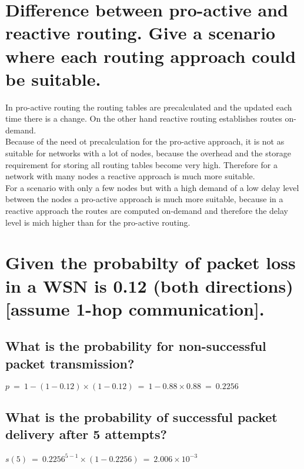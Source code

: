 \documentclass{report}
\begin{document}
	\section{Difference between pro-active and reactive routing. Give a scenario where each routing approach could be suitable.}
	\startsection
		In pro-active routing the routing tables are precalculated and the updated each time there is a change. On the other hand reactive routing establishes routes on-demand. \\
		Because of the need ot precalculation for the pro-active approach, it is not as suitable for networks with a lot of nodes, because the overhead and the storage requirement for storing all routing tables become very high. Therefore for a network with many nodes a reactive approach is much more suitable. \\
		For a scenario with only a few nodes but with a high demand of a low delay level between the nodes a pro-active approach is much more suitable, because in a reactive approach the routes are computed on-demand and therefore the delay level is mich higher than for the pro-active routing.
	\closesection
	
	\section{Given the probabilty of packet loss in a WSN is 0.12 (both directions)[assume 1-hop communication].}
	\startsection
		\subsection{What is the probability for non-successful packet transmission?}
		\startsubsection
			$p \ = \ 1 - (1-0.12) \times (1-0.12) \ = \ 1 - 0.88 \times 0.88 \ = \ 0.2256$
		\closesection
		\subsection{What is the probability of successful packet delivery after 5 attempts?}
		\startsubsection
			$s(5) \ = \ 0.2256^{5-1} \times (1-0.2256) \ = \ 2.006 \times 10^{-3}$
		\closesection
	\closesection
	
\end{document}
